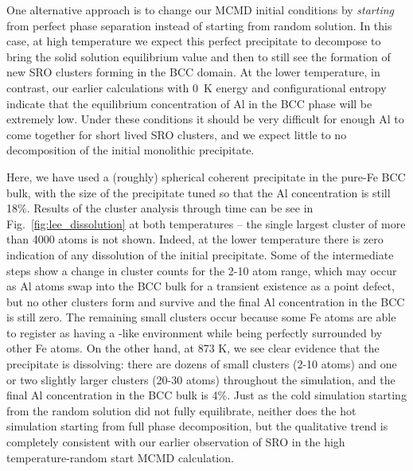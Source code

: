 One alternative approach is to change our MCMD initial conditions by \emph{starting} from perfect phase separation instead of starting from random solution.
In this case, at high temperature we expect this perfect \DOTHREE precipitate to decompose to bring the solid solution equilibrium value and then to still see the formation of new \DOTHREE SRO clusters forming in the BCC domain.
At the lower temperature, in contrast, our earlier calculations with 0~K energy and configurational entropy indicate that the equilibrium concentration of Al in the BCC phase will be extremely low.
Under these conditions it should be very difficult for enough Al to come together for short lived SRO clusters, and we expect little to no decomposition of the initial monolithic precipitate.

Here, we have used a (roughly) spherical \DOTHREE coherent precipitate in the pure-Fe BCC bulk, with the size of the precipitate tuned so that the Al concentration is still 18\%.
Results of the cluster analysis through time can be see in Fig.~\ref{fig:lee_dissolution} at both temperatures -- the single largest cluster of more than 4000 atoms is not shown.
Indeed, at the lower temperature there is zero indication of any dissolution of the initial precipitate.
Some of the intermediate steps show a change in cluster counts for the 2-10 atom range, which may occur as Al atoms swap into the BCC bulk for a transient existence as a point defect, but no other clusters form and survive and the final Al concentration in the BCC is still zero.
The remaining small clusters occur because some Fe atoms are able to register as having a \DOTHREE-like environment while being perfectly surrounded by other Fe atoms.
On the other hand, at 873 K, we see clear evidence that the precipitate is dissolving: there are dozens of small clusters (2-10 atoms) and one or two slightly larger clusters (20-30 atoms) throughout the simulation, and the final Al concentration in the BCC bulk is 4\%.
Just as the cold simulation starting from the random solution did not fully equilibrate, neither does the hot simulation starting from full phase decomposition, but the qualitative trend is completely consistent with our earlier observation of SRO in the high temperature-random start MCMD calculation.


